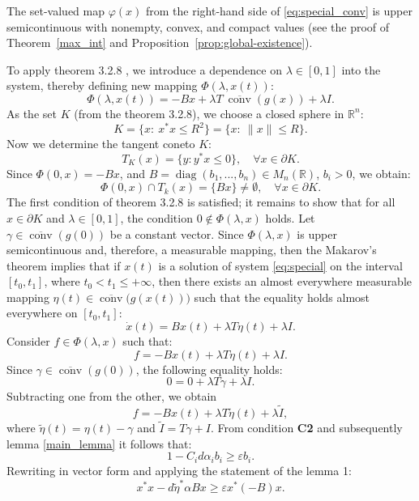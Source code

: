 \documentclass[journal]{IEEEtran}
\theoremstyle{myplain}
\begin{document}
\begin{IEEEproof}
    The set-valued map $\varphi(x)$ from the right-hand side of \eqref{eq:special_conv} is upper semicontinuous with nonempty, convex, and compact values (see the proof of Theorem~\ref{max_int} and Proposition~\ref{prop:global-existence}). 
    
        To apply theorem 3.2.8 \cite[p. 90]{p3}, 
    we introduce a dependence on $\lambda \in [0,1]$ into the system, thereby defining new mapping $\varPhi(\lambda,x(t))$:
    \[\varPhi(\lambda,x(t)) = -Bx + \lambda T~ \overline{\operatorname{conv}}(g(x))+\lambda I.\]
    As the set $K$ (from the theorem 3.2.8), we choose a closed sphere in $\mathbb{R}^n$:
    \[K = \{x:~x^{*}x \leqslant R^2 \} = \{ x:~\|x\| \leqslant R\}.\]
Now we determine the tangent cone\footnotemark[2] to $K$:
\[T_K(x) = \{y : y^{*}x \leqslant 0\}, \quad \forall x \in \partial K.\]
Since $\varPhi(0,x) = -Bx$, and $B =\operatorname{diag}(b_1,...,b_n)\in M_n(\mathbb{R})$, $b_i>0$, we obtain:
\[\varPhi(0,x)\cap T_k(x) = \{Bx\} \ne \emptyset, \quad \forall x \in \partial K.\]
The first condition of theorem 3.2.8 is satisfied; it remains to show that for all $x \in \partial K$ and $\lambda \in [0,1]$, the condition $0 \notin \varPhi(\lambda,x)$ holds.
Let $\gamma \in \overline{\operatorname{conv}}(g(0))$ be a constant vector. Since $\varPhi(\lambda,x)$ is upper semicontinuous and, therefore, a measurable mapping, then the Makarov’s theorem \cite{YLG} implies that if $x(t)$ is a solution of system \eqref{eq:special} on the interval $[t_0,t_1]$, where $t_0<t_1\leqslant+\infty$, then there exists an almost everywhere measurable mapping $\eta(t) \in \overline{\operatorname{conv}}\big(g(x(t))\big)$ such that the equality holds almost everywhere on $[t_0, t_1]$:
\[\dot x(t) = Bx(t) + \lambda T \eta(t) + \lambda I \tag{a.e.}.\]
Consider $f \in \varPhi(\lambda, x)$ such that:
\[f = -Bx(t) + \lambda T \eta(t) + \lambda I .\]
Since $\gamma \in \overline{\operatorname{conv}}(g(0))$, the following equality holds:
\[0 =   0 + \lambda T \gamma + \lambda  I .\]
Subtracting one from the other, we obtain
\begin{equation}\label{2.3.4}
    f = -Bx(t) + \lambda T \widetilde\eta(t) + \lambda \widetilde I,
\end{equation}
where $\widetilde\eta(t) = \eta(t) - \gamma$ and $\widetilde I = T \gamma + I$.
From condition \textbf{C2} and subsequently lemma \ref{main_lemma} it follows that:
    \[
    1 - C_i d  \alpha_i b_i \geqslant \varepsilon b_i. 
    \]
Rewriting in vector form and applying the statement of the lemma 1:
\begin{equation}\label{2.3.5}
x^{*} x - d \widetilde{\eta}^{*}  \alpha  Bx \geqslant \varepsilon x^{*} (-B) x . 
\end{equation}


\end{IEEEproof}
\end{document}
